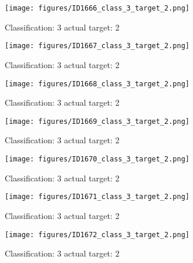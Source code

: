 \begin{figure}[h!]
\begin{center}
\texttt{[image: figures/ID1666\_class\_3\_target\_2.png]}
\end{center}
\caption{ Classification: 3 actual target: 2}
\label{fig:ID1666_class_3_target_2}
\end{figure}
\begin{figure}[h!]
\begin{center}
\texttt{[image: figures/ID1667\_class\_3\_target\_2.png]}
\end{center}
\caption{ Classification: 3 actual target: 2}
\label{fig:ID1667_class_3_target_2}
\end{figure}
\begin{figure}[h!]
\begin{center}
\texttt{[image: figures/ID1668\_class\_3\_target\_2.png]}
\end{center}
\caption{ Classification: 3 actual target: 2}
\label{fig:ID1668_class_3_target_2}
\end{figure}
\begin{figure}[h!]
\begin{center}
\texttt{[image: figures/ID1669\_class\_3\_target\_2.png]}
\end{center}
\caption{ Classification: 3 actual target: 2}
\label{fig:ID1669_class_3_target_2}
\end{figure}
\begin{figure}[h!]
\begin{center}
\texttt{[image: figures/ID1670\_class\_3\_target\_2.png]}
\end{center}
\caption{ Classification: 3 actual target: 2}
\label{fig:ID1670_class_3_target_2}
\end{figure}
\begin{figure}[h!]
\begin{center}
\texttt{[image: figures/ID1671\_class\_3\_target\_2.png]}
\end{center}
\caption{ Classification: 3 actual target: 2}
\label{fig:ID1671_class_3_target_2}
\end{figure}
\begin{figure}[h!]
\begin{center}
\texttt{[image: figures/ID1672\_class\_3\_target\_2.png]}
\end{center}
\caption{ Classification: 3 actual target: 2}
\label{fig:ID1672_class_3_target_2}
\end{figure}
